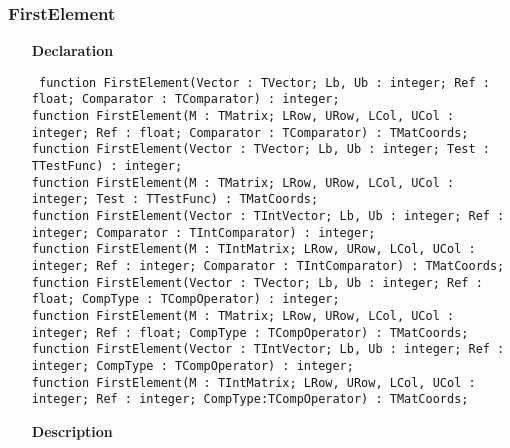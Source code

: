 \documentclass[12pt,a4paper,oneside]{report}
\newcommand{\declarationitem}[1]{\textbf{#1}}
\newcommand{\descriptiontitle}[1]{\textbf{#1}}
\newcommand{\code}[1]{\texttt{#1}}
\begin{document}
\subsubsection{FirstElement}
\label{uvecutils:firstelement}
\begin{itemize}
	\item[\declarationitem{Declaration}\hfill]
\begin{flushleft}
		\code{
	function FirstElement(Vector : TVector; Lb, Ub : integer; Ref : float; Comparator : TComparator) : integer;\\\vspace{4pt}
	function FirstElement(M : TMatrix; LRow, URow, LCol, UCol : integer; Ref : float; Comparator : TComparator) : TMatCoords;\\ 
	\vspace{12pt}
	function FirstElement(Vector : TVector; Lb, Ub : integer; Test : TTestFunc) : integer;\\ \vspace{4pt}
	function FirstElement(M : TMatrix; LRow, URow, LCol, UCol : integer; Test : TTestFunc) : TMatCoords;\\ \vspace{12pt}
	function FirstElement(Vector : TIntVector; Lb, Ub : integer; Ref : integer; Comparator : TIntComparator) : integer;\\ \vspace{4pt}
	function FirstElement(M : TIntMatrix; LRow, URow, LCol, UCol : integer; Ref : integer; Comparator : TIntComparator) : TMatCoords;\\ \vspace{12pt}
	function FirstElement(Vector : TVector; Lb, Ub : integer; Ref : float; CompType : TCompOperator) : integer;\\\vspace{4pt}
	function FirstElement(M : TMatrix; LRow, URow, LCol, UCol : integer; Ref : float; CompType : TCompOperator) : TMatCoords;\\ \vspace{4pt} 
	function FirstElement(Vector : TIntVector; Lb, Ub : integer; Ref : integer; CompType : TCompOperator) : integer;\\ \vspace{4pt}
	function FirstElement(M : TIntMatrix; LRow, URow, LCol, UCol : integer; Ref : integer; CompType:TCompOperator) : TMatCoords; 
}
\end{flushleft}	
\item[\descriptiontitle{Description}]

\end{itemize}
\end{document}
